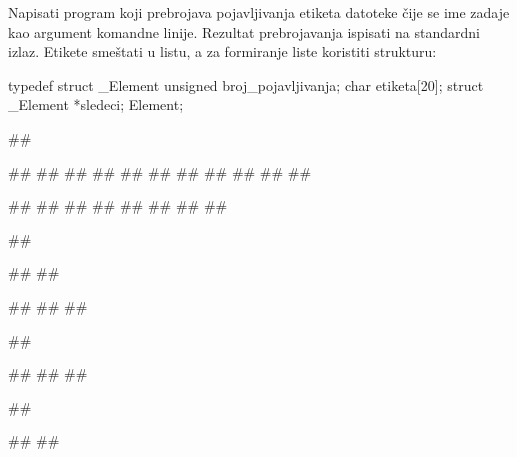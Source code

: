 \begin{Exercise}[label=607]
Napisati program koji prebrojava pojavljivanja etiketa  
datoteke čije se ime zadaje kao argument komandne linije. Rezultat prebrojavanja 
ispisati na standardni izlaz. Etikete smeštati u listu, a za formiranje liste koristiti strukturu:
\begin{ckod} 
 typedef struct _Element
 {
   unsigned broj_pojavljivanja;
   char etiketa[20];
   struct _Element *sledeci;
 } Element;
\end{ckod}
\begin{miditest}
\begin{test}{1}
##

##
##                       
##
##
##
##
##
##     
## 
## 
## 

#\naslovIzlaz#
##
##
##
##
##
##
##
\end{test}
\end{miditest}
\begin{miditest}
\begin{test}{2}
##

##
##

#\naslovIzlaz#
##
##
\end{test}
\end{miditest}
\begin{miditest}
\begin{test}{3}
##

#\naslovIzlaz#
##
##
\end{test}
\end{miditest}
\begin{miditest}
\begin{test}{4}
##

##
##
\end{test}
\end{miditest}
\end{Exercise}
\begin{Answer}[ref=607]
\end{Answer}

